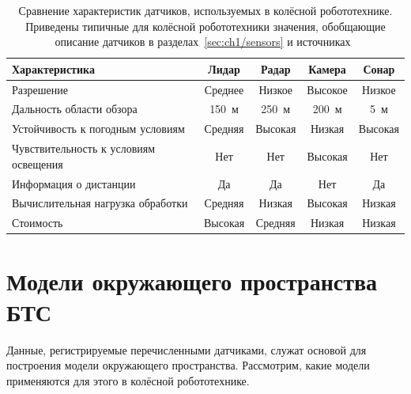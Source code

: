\begin{table}[h!]
	\small
	\centering
	\begin{tabular}{|l|c|c|c|c|}
		\hline
		\textbf{Характеристика}          & \textbf{Лидар} & \textbf{Радар} & \textbf{Камера} & \textbf{Сонар}\\
		\hline
		Разрешение                       & Среднее    & Низкое  & Высокое & Низкое  \\
		Дальность области обзора\footnotemark[1]         & 150~м & 250~м & 200~м & 5~м \\
		Устойчивость к погодным условиям & Средняя    & Высокая & Низкая  & Высокая \\
		Чувствительность к условиям освещения & Нет   & Нет     & Высокая & Нет     \\
		Информация о дистанции           & Да         & Да      & Нет     & Да      \\
		Вычислительная нагрузка обработки& Средняя    & Низкая  & Высокая & Низкая  \\
	    Стоимость                        & Высокая    & Средняя & Низкая  & Низкая  \\
		\hline
	\end{tabular}
	\caption{Сравнение характеристик датчиков, используемых в колёсной робототехнике. Приведены типичные для колёсной робототехники значения, обобщающие описание датчиков в разделах~\cref{sec:ch1/sensors} и источниках~\autocite{ignatious2022overview, vargas2021overview, kleeman2016sonar}}\label{tab:sensors}
\end{table}


\section{Модели окружающего пространства БТС}\label{sec:ch1/models}

Данные, регистрируемые перечисленными датчиками, служат основой для построения модели окружающего пространства. Рассмотрим, какие модели применяются для этого в колёсной робототехнике.

